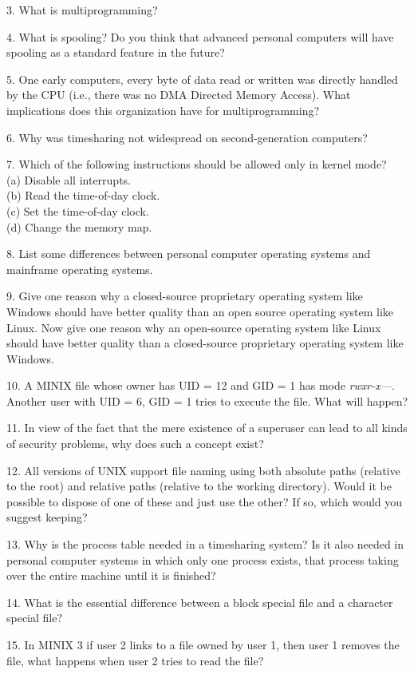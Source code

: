 \documentclass{book}
\newcommand {\sys} [1] {\textsl{#1}}
\begin{document}
3. What is multiprogramming?

4. What is spooling? Do you think that advanced personal computers will have spooling as a standard feature in the future?

5. One early computers, every byte of data read or written was directly handled by the CPU (i.e., there was no DMA Directed Memory Access).
What implications does this organization have for multiprogramming?

6. Why was timesharing not widespread on second-generation computers?

7. Which of the following instructions should be allowed only in kernel mode?\\
(a) Disable all interrupts.\\
(b) Read the time-of-day clock.\\
(c) Set the time-of-day clock.\\
(d) Change the memory map.

8. List some differences between personal computer operating systems and mainframe operating systems.

9. Give one reason why a closed-source proprietary operating system like Windows should have better quality than 
an open source operating system like Linux.
Now give one reason why an open-source operating system like Linux should have better quality than 
a closed-source proprietary operating system like Windows.

10. A MINIX file whose owner has UID = 12 and GID = 1 has mode \sys{rwxr-x---}.
Another user with UID = 6, GID = 1 tries to execute the file. What will happen?

11. In view of the fact that the mere existence of a superuser can lead to all kinds of security problems, why does such a concept exist?
  
12. All versions of UNIX support file naming using both absolute paths (relative to the root) and 
relative paths (relative to the working directory). 
Would it be possible to dispose of one of these and just use the other?
If so, which would you suggest keeping?

13. Why is the process table needed in a timesharing system?
Is it also needed in personal computer systems in which only one process exists,
that process taking over the entire machine until it is finished?

14. What is the essential difference between a block special file and a character special file?

15. In MINIX 3 if user 2 links to a file owned by user 1, then user 1 removes the file, what happens when user 2 tries to read the file?
\end{document}
